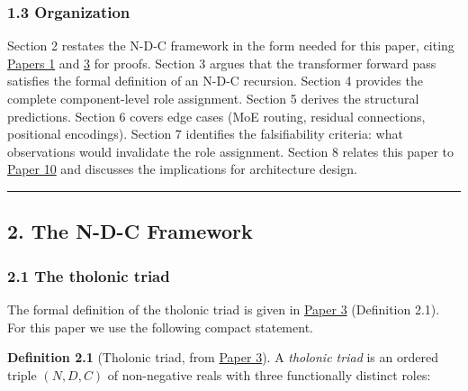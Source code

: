 \documentclass[
  11pt,
  letterpaper,
]{article}
\begin{document}
\subsubsection{1.3 Organization}\label{organization}

Section 2 restates the N-D-C framework in the form needed for this
paper, citing
\href{https://github.com/baardev/truevalue/blob/main/docnav/Research/papers/1_recursive-tholonic-five-constants/1_recursive-tholonic-five-constants.pdf}{Papers
1} and
\href{https://github.com/baardev/truevalue/blob/main/docnav/Research/papers/3_minimal-recursive-triadic-framework/3_minimal-recursive-triadic-framework.pdf}{3}
for proofs. Section 3 argues that the transformer forward pass satisfies
the formal definition of an N-D-C recursion. Section 4 provides the
complete component-level role assignment. Section 5 derives the
structural predictions. Section 6 covers edge cases (MoE routing,
residual connections, positional encodings). Section 7 identifies the
falsifiability criteria: what observations would invalidate the role
assignment. Section 8 relates this paper to
\href{https://github.com/baardev/truevalue/blob/main/docnav/Research/papers/10_tholonic-neural-architecture/10_tholonic-neural-architecture.pdf}{Paper
10} and discusses the implications for architecture design.

\begin{center}\rule{0.5\linewidth}{0.5pt}\end{center}

\subsection{2. The N-D-C Framework}\label{the-n-d-c-framework}

\subsubsection{2.1 The tholonic triad}\label{the-tholonic-triad}

The formal definition of the tholonic triad is given in
\href{https://github.com/baardev/truevalue/blob/main/docnav/Research/papers/3_minimal-recursive-triadic-framework/3_minimal-recursive-triadic-framework.pdf}{Paper
3} (Definition 2.1). For this paper we use the following compact
statement.

\textbf{Definition 2.1} (Tholonic triad, from
\href{https://github.com/baardev/truevalue/blob/main/docnav/Research/papers/3_minimal-recursive-triadic-framework/3_minimal-recursive-triadic-framework.pdf}{Paper
3}). A \emph{tholonic triad} is an ordered triple \((N, D, C)\) of
non-negative reals with three functionally distinct roles:
\end{document}
